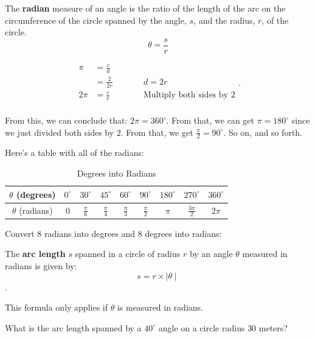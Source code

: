 \begin{definition}[Radian]
  \label{def:radion}

  The \textbf{radian} measure of an angle is the ratio of the length of the arc
  on the circumference of the circle spanned by the angle, $s$, and the radius,
  $r$, of the circle.
  \[ \theta = \frac{s}{r} \]

  \begin{equation}
    \label{edt:entire_revolution_using_raidans}
    \begin{alignedat}{3}
      \pi &= \frac{c}{d} \\
          &= \frac{2}{2r} \qquad && \textrm{$d = 2r$} \\
      2\pi &= \frac{c}{r} \qquad && \textrm{Multiply both sides by $2$} \\
    \end{alignedat}
  .\end{equation}

  From this, we can conclude that: $2\pi = 360^{\circ}$. From that, we can get
  $\pi = 180^{\circ}$ since we just divided both sides by $2$. From that, we get
  $\frac{\pi}{2} = 90^{\circ}$. So on, and so forth.

  Here's a table with all of the radians:

  \begin{table}[H]
    \label{tab:degrees_into_radians}
    \centering

    \begin{tabular}{|c|c|c|c|c|c|c|c|c|}
      \hline
      $\theta$ (degrees) & $0^{\circ}$ & $30^{\circ}$ & $45^{\circ}$ & $60^{\circ}$ & $90^{\circ}$ & $180^{\circ}$ & $270^{\circ}$ & $360^{\circ}$ \\
      \hline
      $\theta$ (radians) & $0$ & $\frac{\pi}{6}$ & $\frac{\pi}{4}$ &
      $\frac{\pi}{3}$ & $\frac{\pi}{2}$ & $\pi$ & $\frac{3\pi}{2}$ & $2\pi$ \\
      \hline
    \end{tabular}

    \caption{Degrees into Radians}
  \end{table}
\end{definition}

\begin{exc}
  \label{exc:convert_8_radians_into_degrees_and_8_into_radians}

  Convert $8$ radians into degrees and $8$ degrees into radians:
\end{exc}

\begin{definition}
  \label{def:arc_length}

  The \textbf{arc length} $s$ spanned in a circle of radius $r$ by an angle
  $\theta$ measured in radians is given by:
  \[ s = r \times \mid \theta \mid \].

  \begin{note}
    This formula only applies if $\theta$ is measured in radians.
  \end{note}
\end{definition}

\begin{exc}
  \label{exc:what_is_the_arc_length_spanned_by_a_40_degree_angle_on_a_circle_of_radius_30_meters}

  What is the arc length spanned by a $40^{\circ}$ angle on a circle radius $30$
  meters?
\end{exc}

\newpage
